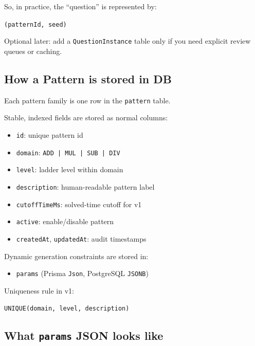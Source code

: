 \documentclass[11pt]{article}
\begin{document}
So, in practice, the ``question'' is represented by:

\begin{center}
\texttt{(patternId, seed)}
\end{center}

Optional later: add a \texttt{QuestionInstance} table only if you need explicit review queues or caching.

\subsection*{How a Pattern is stored in DB}

Each pattern family is one row in the \texttt{pattern} table.

Stable, indexed fields are stored as normal columns:

\begin{itemize}[leftmargin=*]
        \item \texttt{id}: unique pattern id
        \item \texttt{domain}: \texttt{ADD | MUL | SUB | DIV}
        \item \texttt{level}: ladder level within domain
        \item \texttt{description}: human-readable pattern label
        \item \texttt{cutoffTimeMs}: solved-time cutoff for v1
        \item \texttt{active}: enable/disable pattern
        \item \texttt{createdAt}, \texttt{updatedAt}: audit timestamps
\end{itemize}

Dynamic generation constraints are stored in:

\begin{itemize}[leftmargin=*]
        \item \texttt{params} (Prisma \texttt{Json}, PostgreSQL \texttt{JSONB})
\end{itemize}

Uniqueness rule in v1:

\begin{center}
\texttt{UNIQUE(domain, level, description)}
\end{center}

\subsection*{What \texttt{params} JSON looks like}
\end{document}
